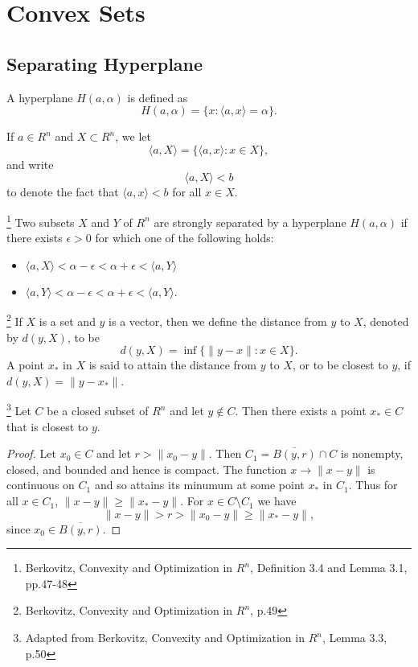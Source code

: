 \chapter{Convex Sets}

\section{Separating Hyperplane}

\begin{definition}
A hyperplane $H(a,\alpha)$ is defined as
\[
  H(a,\alpha)=\{x: \langle a,x \rangle = \alpha \}.
\]
\end{definition}

If $a\in R^n$ and $X\subset R^n$, we let
\[
  \langle a,X \rangle = \{ \langle a,x \rangle : x\in X \},
\]
and write 
\[
  \langle a,X \rangle < b
\] 
to denote the fact that $\langle a,x \rangle <b$ for all $x\in X$.

\begin{definition}
\footnote{Berkovitz, Convexity and Optimization in $R^n$, Definition 3.4 and
Lemma 3.1, pp.47-48}
Two subsets $X$ and $Y$ of $R^n$ are strongly separated by a hyperplane
$H(a,\alpha)$ if there exists $\epsilon>0$ for which one of the following
holds:
\begin{itemize}
  \item[(1)] $\langle a,X \rangle < \alpha-\epsilon < \alpha+\epsilon
               < \langle a,Y \rangle$
  \item[(2)] $\langle a,Y \rangle < \alpha-\epsilon < \alpha+\epsilon
               < \langle a,Y \rangle$.
\end{itemize}

\end{definition}

\begin{definition}
\footnote{Berkovitz, Convexity and Optimization in $R^n$, p.49}
If $X$ is a set and $y$ is a vector, then we define the distance from $y$
to $X$, denoted by $d(y,X)$, to be 
\[
  d(y,X) = \inf \{ \| y-x \|: x\in X \}.
\]
A point $x_*$ in $X$ is said to attain the distance from $y$ to $X$, or to
be closest to $y$, if $d(y,X)=\| y-x_* \|$.
\end{definition}

\begin{lemma}
\footnote{Adapted from Berkovitz, Convexity and Optimization in $R^n$, Lemma
          3.3, p.50}
Let $C$ be a closed subset of $R^n$ and let $y\notin C$. Then there exists a 
point $x_* \in C$ that is closest to $y$.
\end{lemma}
\begin{proof}
Let $x_0\in C$ and let $r>\| x_0-y \|$. Then $C_1=\overline{B(y,r)}\cap C$ is
nonempty, closed, and bounded and hence is compact. The function
$x\to \| x-y \|$ is continuous on $C_1$ and so attains its minumum at some
point $x_*$ in $C_1$. Thus for all $x\in C_1$, $\| x-y \| \ge \| x_*-y \|$.
For $x\in C\setminus C_1$ we have
\[
  \| x-y \| > r > \| x_0-y \| \ge \| x_*-y \|,
\]
since $x_0 \in \overline{B(y,r)}$.
\end{proof}


